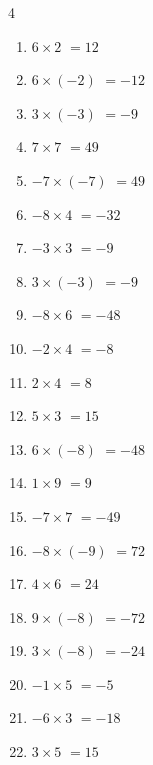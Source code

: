\begin{multicols}{4}
\begin{enumerate}
  \item $6\times 2$
        $=12$

  \item $6\times (-2)$
        $=-12$

  \item $3\times (-3)$
        $=-9$

\columnbreak %

  \item $7\times 7$
        $=49$

  \item $-7\times (-7)$
        $=49$

  \item $-8\times 4$
        $=-32$

  \item $-3\times 3$
        $=-9$

  \item $3\times (-3)$
        $=-9$

  \item $-8\times 6$
        $=-48$

  \item $-2\times 4$
        $=-8$

  \item $2\times 4$
        $=8$

  \item $5\times 3$
        $=15$

  \item $6\times (-8)$
        $=-48$

  \item $1\times 9$
        $=9$

  \item $-7\times 7$
        $=-49$

  \item $-8\times (-9)$
        $=72$

  \item $4\times 6$
        $=24$

  \item $9\times (-8)$
        $=-72$

  \item $3\times (-8)$
        $=-24$

  \item $-1\times 5$
        $=-5$

  \item $-6\times 3$
        $=-18$

  \item $3\times 5$
        $=15$


\end{enumerate}
\end{multicols}
